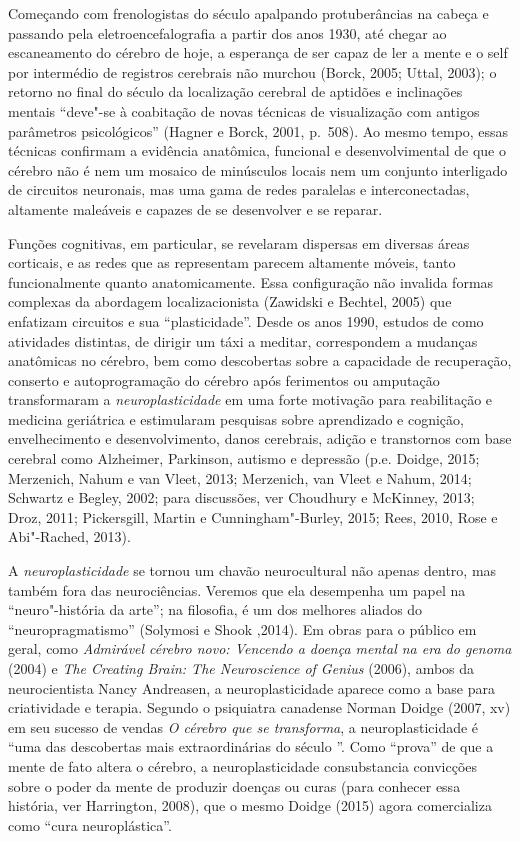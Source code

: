 Começando com frenologistas do século  apalpando protuberâncias na
cabeça e passando pela eletroencefalografia a partir dos anos 1930, até
chegar ao escaneamento do cérebro de hoje, a esperança de ser capaz de
ler a mente e o self por intermédio de registros cerebrais não murchou
(Borck, 2005; Uttal, 2003); o retorno no final do século  da
localização cerebral de aptidões e inclinações mentais ``deve"-se à
coabitação de novas técnicas de visualização com antigos parâmetros
psicológicos'' (Hagner e Borck, 2001, p.~508). Ao mesmo tempo, essas
técnicas confirmam a evidência anatômica, funcional e desenvolvimental
de que o cérebro não é nem um mosaico de minúsculos locais nem um
conjunto interligado de circuitos neuronais, mas uma gama de redes
paralelas e interconectadas, altamente maleáveis e capazes de se
desenvolver e se reparar.

Funções cognitivas, em particular, se revelaram dispersas em diversas
áreas corticais, e as redes que as representam parecem altamente móveis,
tanto funcionalmente quanto anatomicamente. Essa configuração não
invalida formas complexas da abordagem localizacionista (Zawidski e
Bechtel, 2005) que enfatizam circuitos e sua ``plasticidade''. Desde os
anos 1990, estudos de como atividades distintas, de dirigir um táxi a
meditar, correspondem a mudanças anatômicas no cérebro, bem como
descobertas sobre a capacidade de recuperação, conserto e
autoprogramação do cérebro após ferimentos ou amputação transformaram a
\emph{neuroplasticidade} em uma forte motivação para reabilitação e
medicina geriátrica e estimularam pesquisas sobre aprendizado e
cognição, envelhecimento e desenvolvimento, danos cerebrais, adição e
transtornos com base cerebral como Alzheimer, Parkinson, autismo e
depressão (p.e. Doidge, 2015; Merzenich, Nahum e van Vleet, 2013;
Merzenich, van Vleet e Nahum, 2014; Schwartz e Begley, 2002; para
discussões, ver Choudhury e McKinney, 2013; Droz, 2011; Pickersgill,
Martin e Cunningham"-Burley, 2015; Rees, 2010, Rose e Abi"-Rached, 2013).

A \emph{neuroplasticidade} se tornou um chavão neurocultural não apenas
dentro, mas também fora das neurociências. Veremos que ela desempenha um
papel na ``neuro"-história da arte''; na filosofia, é um dos melhores
aliados do ``neuropragmatismo'' (Solymosi e Shook ,2014). Em obras para
o público em geral, como \emph{Admirável cérebro novo: Vencendo a doença
mental na era do genoma} (2004) e \emph{The Creating Brain: The
Neuroscience of Genius} (2006), ambos da neurocientista Nancy Andreasen,
a neuroplasticidade aparece como a base para criatividade e terapia.
Segundo o psiquiatra canadense Norman Doidge (2007, xv) em seu sucesso
de vendas \emph{O cérebro que se transforma}, a neuroplasticidade é
``uma das descobertas mais extraordinárias do século ''. Como
``prova'' de que a mente de fato altera o cérebro, a neuroplasticidade
consubstancia convicções sobre o poder da mente de produzir doenças ou
curas (para conhecer essa história, ver Harrington, 2008), que o mesmo
Doidge (2015) agora comercializa como ``cura neuroplástica''.

